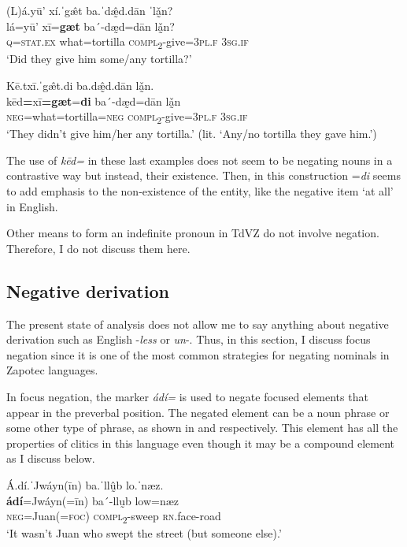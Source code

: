 \documentclass[output=paper,colorlinks=true, citecolor=brown]{langscibook}
\begin{document}
\ea\label{ex:zap:71} 
    \glll (L)á.yū’ xí.ˈg\^{æ}t ba.ˈdæ̰̂d.dān ˈlǎ̰n?\\ 
          lá=yū’ xī=\textbf{gæt} ba´-dæ̰d=dān lǎ̰n?\\
          \textsc{q}=\textsc{stat.ex} what=tortilla \textsc{compl}\textsc{\textsubscript{2}}{}-give=\textsc{3pl.f} \textsc{3sg.if}\\
    \glt ‘Did they give him some/any tortilla?’
\z 

\ea\label{ex:zap:72} 
    \glll Kē.txī.ˈg\^{æ}t.di ba.dæ̰̂d.dān lǎ̰n.\\ 
           kēd\textbf{=}xī\textbf{=gæt}=\textbf{di} ba´-dæ̰d=dān lǎ̰n\\
           \textsc{neg}=what=tortilla=\textsc{neg} \textsc{compl}\textsc{\textsubscript{2}}{}-give=\textsc{3pl.f} \textsc{3sg.if}\\
    \glt  ‘They didn’t give him/her any tortilla.’ (lit. ‘Any/no tortilla they gave him.’)
\z 

The use of \textit{kēd=} in these last examples does not seem to be negating nouns in a contrastive way but instead, their existence. Then, in this construction =\textit{di} seems to add emphasis to the non-existence of the entity, like the negative item ‘at all’ in English.

Other means to form an indefinite pronoun in TdVZ do not involve negation. Therefore, I do not discuss them here. 

\subsection{Negative derivation}\label{sec:zap:3.3}

The present state of analysis does not allow me to say anything about negative derivation such as English -\textit{less} or \textit{un}{}-. Thus, in this section, I discuss focus negation since it is one of the most common strategies for negating nominals in Zapotec languages.

In focus negation, the marker \textit{ádí=} is used to negate focused elements that appear in the preverbal position. The negated element can be a noun phrase or some other type of phrase, as shown in  and  respectively. This element has all the properties of clitics in this language even though it may be a compound element as I discuss below. 

\ea\label{ex:zap:73} 
    \glll Á.dí.ˈJwáyn(īn) ba.ˈllṵ̂b lo.ˈnæz. \\ 
          \textbf{ádí}=Jwáyn(=īn) ba´-llṵb low=næz\\
          \textsc{neg}=Juan(=\textsc{foc}) \textsc{compl}\textsc{\textsubscript{2}}{}-sweep \textsc{rn}.face-road\\
    \glt ‘It wasn’t Juan who swept the street (but someone else).’
\z 
\end{document}
